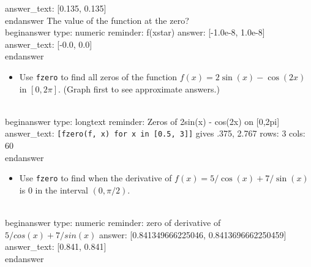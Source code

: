 \documentclass[12pt]{article}
\begin{document}
    answer_text: [0.135, 0.135] 
\\end{answer}
\newline
The value of the function at the zero?
\\begin{answer}
    type: numeric
    reminder: f(xstar)
    answer: [-1.0e-8, 1.0e-8]
    answer_text: [-0.0, 0.0] 
\\end{answer}
\begin{itemize}\item Use \texttt{fzero} to find all zeros of the function $f(x) = 2\sin(x) -   \cos(2x)$ in $[0, 2\pi]$. (Graph first to see approximate answers.)\end{itemize}
\\begin{answer}
type: longtext
reminder: Zeros of 2sin(x) - cos(2x) on [0,2pi]
answer_text: \verb+[fzero(f, x) for x in [0.5, 3]]+ gives .375, 2.767 
rows: 3
cols: 60
\\end{answer}
\begin{itemize}\item Use \texttt{fzero} to find when the derivative of $f(x) = 5/\cos(x) +   7/\sin(x)$ is $0$ in the interval $(0, \pi/2)$.\end{itemize}
\\begin{answer}
    type: numeric
    reminder: zero of derivative of \( 5/cos(x) + 7/sin(x) \)
    answer: [0.841349666225046, 0.8413696662250459]
    answer_text: [0.841, 0.841] 
\\end{answer}
\end{document}
